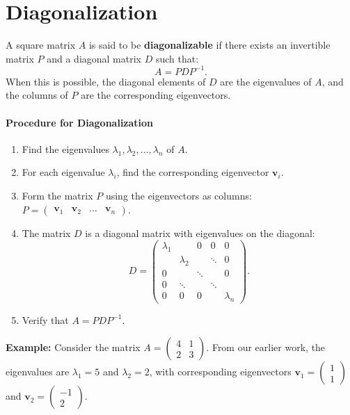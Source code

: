 \documentclass[]{article}
\begin{document}
	\section{Diagonalization}
	
	A square matrix $A$ is said to be \textbf{diagonalizable} if there exists an invertible matrix $P$ and a diagonal matrix $D$ such that:
	$$
	A = PDP^{-1}.
	$$
	When this is possible, the diagonal elements of $D$ are the eigenvalues of $A$, and the columns of $P$ are the corresponding eigenvectors.
	
	\paragraph{Procedure for Diagonalization}
	
	\begin{enumerate}
		\item Find the eigenvalues $\lambda_1, \lambda_2, \ldots, \lambda_n$ of $A$.
		\item For each eigenvalue $\lambda_i$, find the corresponding eigenvector $\mathbf{v}_i$.
		\item Form the matrix $P$ using the eigenvectors as columns: $P = \begin{pmatrix} \mathbf{v}_1 & \mathbf{v}_2 & \ldots & \mathbf{v}_n \end{pmatrix}$.
		\item The matrix $D$ is a diagonal matrix with eigenvalues on the diagonal:
		$$
		D =
		\begin{pmatrix}
			\lambda_1 & & 0 & 0 & 0 \\
			 & \lambda_2 & & \ddots & 0 \\
			0 & & \ddots & & 0 \\
			0 & \ddots & & \ddots &  \\
			0 & 0 & 0 & & \lambda_n
		\end{pmatrix}.
		$$
		\item Verify that $A = PDP^{-1}$.
	\end{enumerate}
	
	\noindent \textbf{Example:}
	Consider the matrix $A = \begin{pmatrix} 4 & 1 \\ 2 & 3 \end{pmatrix}$.
	From our earlier work, the eigenvalues are $\lambda_1 = 5$ and $\lambda_2 = 2$, with corresponding eigenvectors $\mathbf{v}_1 = \begin{pmatrix} 1 \\ 1 \end{pmatrix}$ and $\mathbf{v}_2 = \begin{pmatrix} -1 \\ 2 \end{pmatrix}$.
	
\end{document}
